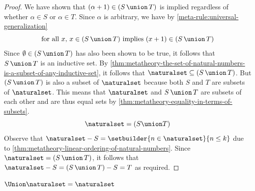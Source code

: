 \begin{proof}
    \vspace{0.3cm}
    \noindent
    We have shown that \( \mleft( \alpha + 1 \mright) \in \mleft( S \,{\union}\, T \mright) \) is implied regardless of whether \( \alpha \in S \) or \( \alpha \in T \).
    Since \( \alpha \) is arbitrary, we have by \cref{meta-rule:universal-generalization}
    \begin{equation*}
        \text{for all \( x \), \( x \in \mleft( S \,{\union}\, T \mright) \) implies \( \mleft( x + 1 \mright) \in \mleft( S \,{\union}\, T \mright) \)}
    \end{equation*}
    Since \( \emptyset \in \mleft( S \,{\union}\, T \mright) \) has also been shown to be true, it follows that \( S \,{\union}\, T \) is an inductive set.
    By \cref{thm:metatheory-the-set-of-natural-numbers-is-a-subset-of-any-inductive-set}, it follows that \( \naturalset \subseteq \mleft( S \,{\union}\, T \mright) \).
    But \( \mleft( S \,{\union}\, T \mright) \) is also a subset of \( \naturalset \) because both \( S \) and \( T \) are subsets of \( \naturalset \).
    This means that \( \naturalset \) and \( S \,{\union}\, T \) are subsets of each other and are thus equal sets by \cref{thm:metatheory-equality-in-terms-of-subsets}.
    \begin{equation*}
        \naturalset = \mleft( S \union T \mright)
    \end{equation*}
    Observe that \( \naturalset - S = \setbuilder{n \in \naturalset}{n \leq k} \) due to \cref{thm:metatheory-linear-ordering-of-natural-numbers}.
    Since \( \naturalset = \mleft( S \,{\union}\, T \mright) \), it follows that \( \naturalset - S = \mleft( S \,{\union}\, T \mright) - S = T \)
    as required.
\end{proof}

\begin{thm}
     \label{thm:metatheory-the-union-of-N-is-N-itself}
    \( \Union \naturalset = \naturalset \)
\end{thm}

